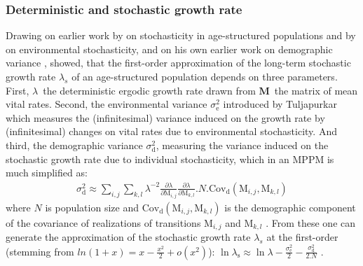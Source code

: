 \documentclass[10pt,a4paper]{article}
\newcommand{\M}{$\mathbf{M}$}
\newcommand{\lam}{$\lambda$}
\begin{document}
\subsubsection{Deterministic and stochastic growth rate}

Drawing on earlier work by \citet{Cohen1977a,Cohen1979} on stochasticity in age-structured populations and by \citet{Tuljapurkar1982,Tuljapurkar1990b} on environmental stochasticity, and on his own earlier work on demographic variance \citep{Engen1998a}, \citet{Engen2005b} showed, that the first-order approximation of the long-term stochastic growth rate $\lambda_{s}$ of an age-structured population depends on three parameters. First, \lam\, the deterministic ergodic growth rate drawn from \M\, the matrix of mean vital rates.
Second, the environmental variance $\sigma_\mathrm{e}^2$ introduced by Tuljapurkar \citep{Tuljapurkar1982,Tuljapurkar1990b} which measures the (infinitesimal) variance induced on the growth rate by (infinitesimal) changes on vital rates due to environmental stochasticity. 
And third, the demographic variance $\sigma_\mathrm{d}^2$, measuring the variance induced on the stochastic growth rate due to individual stochasticity, which in an MPPM is much simplified as: 
\begin{eqnarray}
\sigma_\mathrm{d}^2 \approx \sum_{i,j} \sum_{k,l} \lambda^{-2}\frac{\partial \lambda}{\partial \mathrm{M}_{i,j}}\frac{\partial \lambda}{\partial \mathrm{M}_{k,l}}.N.\mathrm{Cov_d}(\mathrm{M}_{i,j},\mathrm{M}_{k,l}) 
\label{eq:sigmad}
\end{eqnarray}
where $N$ is population size and  $\mathrm{Cov_d}(\mathrm{M}_{i,j},\mathrm{M}_{k,l})$ is the demographic component of the covariance of realizations of transitions $\mathrm{M}_{i,j}$ and $\mathrm{M}_{k,l}$ \citep{Engen2005b}.
From these one can generate the approximation of the stochastic growth rate $\lambda_{s}$ at the first-order (stemming from $ln(1+x)=x-\frac{x^{2}}{2} +o(x^{2})$): $
\ln \lambda_\mathrm{s} \approx \ln \lambda - \frac{\sigma_\mathrm{e}^2}{2} - \frac{\sigma_\mathrm{d}^2}{2.N} $
\citep{Engen2005b,Tuljapurkar1982}.
\end{document}
